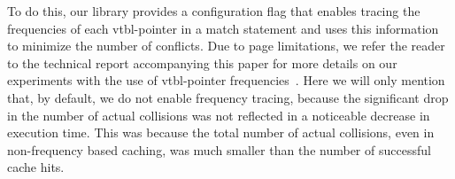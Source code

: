 To do this, our library provides a configuration flag that enables tracing the
frequencies of each vtbl-pointer in a match statement and uses this information to 
minimize the number of conflicts. Due to page limitations, we refer the reader 
to the technical report accompanying this paper for more details on our 
experiments with the use of vtbl-pointer frequencies~\cite[.2]{TR}. Here we will only 
mention that, by default, we do not enable frequency tracing, because the 
significant drop in the number of actual collisions was not reflected in a 
noticeable decrease in execution time. This was because the total 
number of actual collisions, even in non-frequency based caching, was much smaller 
than the number of successful cache hits.
